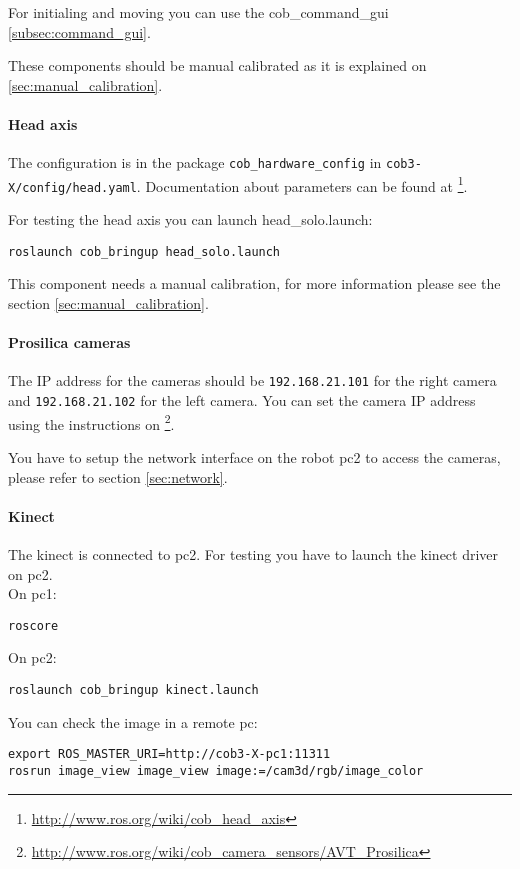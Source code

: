 For initialing and moving you can use the cob\_command\_gui \ref{subsec:command_gui}.

These components should be manual calibrated as it is explained on \ref{sec:manual_calibration}.

\paragraph{Head axis}
The configuration is in the package \texttt{cob\_hardware\_config} in \texttt{cob3-X/config/head.yaml}. Documentation about parameters can be found at \footnote{\url{http://www.ros.org/wiki/cob_head_axis}}.

For testing the head axis you can launch head\_solo.launch:
\begin{lstlisting}
roslaunch cob_bringup head_solo.launch
\end{lstlisting}

This component needs a manual calibration, for more information please see the section \ref{sec:manual_calibration}.

\paragraph{Prosilica cameras}
The IP address for the cameras should be \texttt{192.168.21.101} for the right camera and \texttt{192.168.21.102} for the left camera. You can set the camera IP address using the instructions on \footnote{\url{http://www.ros.org/wiki/cob_camera_sensors/AVT_Prosilica}}.

You have to setup the network interface on the robot pc2 to access the cameras, please refer to section \ref{sec:network}.

\paragraph{Kinect}
The kinect is connected to pc2. 
For testing you have to launch the kinect driver on pc2.
\\On pc1:
\begin{lstlisting}
roscore
\end{lstlisting}
On pc2:
\begin{lstlisting}
roslaunch cob_bringup kinect.launch
\end{lstlisting}

You can check the image in a remote pc:
\begin{lstlisting}
export ROS_MASTER_URI=http://cob3-X-pc1:11311
rosrun image_view image_view image:=/cam3d/rgb/image_color
\end{lstlisting}

